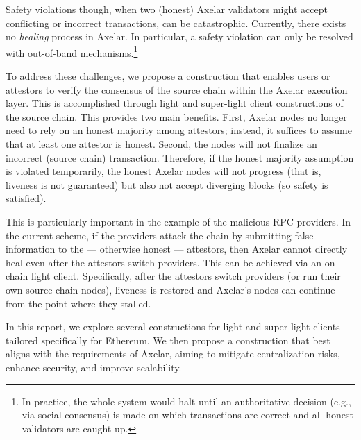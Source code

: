 Safety violations though, when two (honest) Axelar validators might accept conflicting or incorrect transactions, can be catastrophic.
Currently, there exists no \emph{healing} process in Axelar. In particular, a safety violation can only be resolved with out-of-band mechanisms.\footnote{In practice, the whole system would halt until an authoritative decision (e.g., via social consensus) is made on which transactions are correct and all honest validators are caught up.}



To address these challenges, we propose a construction that enables users or attestors to verify the consensus of the source chain within the Axelar execution layer. This is accomplished through light and super-light client constructions of the source chain. This provides two main benefits. First, Axelar nodes no longer need to rely on an honest majority among attestors; instead, it suffices to assume that at least one attestor is honest. Second, the nodes will not finalize an incorrect (source chain) transaction. Therefore, if the honest majority assumption is violated temporarily, the honest Axelar nodes will not progress (that is, liveness is not guaranteed) but also not accept diverging blocks (so safety is satisfied).

This is particularly important in the example of the malicious RPC providers. In the current scheme, if the providers attack the chain by submitting false information to the --- otherwise honest --- attestors, then Axelar cannot directly heal even after the attestors switch providers. This can be achieved via an on-chain light client. Specifically, after the attestors switch providers (or run their own source chain nodes), liveness is restored and Axelar's nodes can continue from the point where they stalled.

In this report, we explore several constructions for light and super-light clients tailored specifically for Ethereum. We then propose a construction that best aligns with the requirements of Axelar, aiming to mitigate centralization risks, enhance security, and improve scalability.
